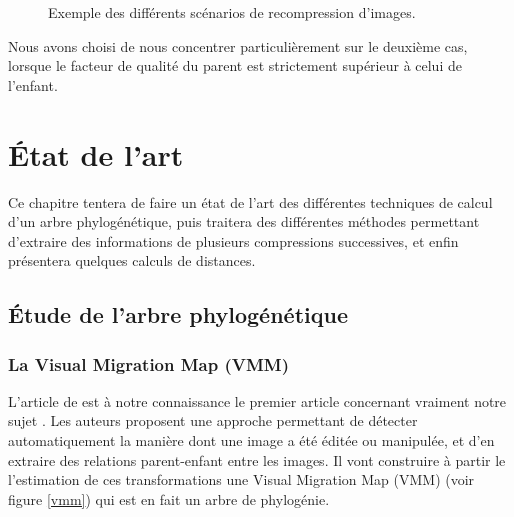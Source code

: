 \documentclass[utf8,final]{stageM2R} %
\begin{document}
\begin{figure}[H]
\begin{center}
{}
      \caption{Exemple des différents scénarios de recompression d'images.}
      \label{comp_vaste}
    \end{center}
  \end{figure}

Nous avons choisi de nous concentrer particulièrement sur le deuxième cas, lorsque le facteur de qualité du parent est strictement supérieur à celui de l'enfant.

\chapter{État de l'art}
\label{chap2}
Ce chapitre tentera de faire un état de l'art des différentes techniques de calcul d'un arbre phylogénétique, puis traitera des différentes méthodes permettant d'extraire des informations de plusieurs compressions successives, et enfin présentera quelques calculs de distances.
\section{Étude de l'arbre phylogénétique}
\label{etude}
\subsection{La Visual Migration Map (VMM)}
L'article de  est à notre connaissance le premier article concernant vraiment notre sujet \autocite{kennedy2008internet}. Les auteurs proposent une approche permettant de détecter automatiquement la manière dont une image a été éditée ou manipulée, et d'en extraire des relations parent-enfant entre les images. Il vont construire à partir le l'estimation de ces transformations une Visual Migration Map (VMM) (voir figure \ref{vmm}) qui est en fait un arbre de phylogénie.
\end{document}
